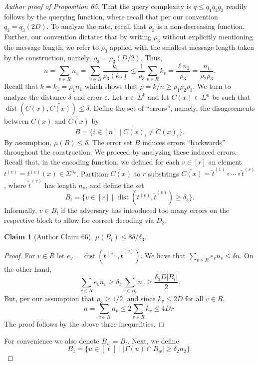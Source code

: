\documentclass[10pt,a4paper]{article}
\newtheorem{ntclaim}[nttheorem]{Claim}
\begin{document}
\begin{proof}[Author proof of Proposition 65]
That the query complexity is $q\leq q_1q_2q_3$ readily follows by the querying function, where recall that per our convention $q_3=q_3(2D)$. To analyze the rate, recall that $\rho_3$ is a non-decreasing function. Further, our convention dictates that by writing $\rho_3$ without explicitly mentioning the message length, we refer to $\rho_3$ applied with the smallest message length taken by the construction, namely, $\rho_3=\rho_3(D/2)$. Thus,
\[n=\sum_{v\in R}n_v=\sum_{v\in R}\frac{k_v}{\rho_3(k_v)}\leq\frac1{\rho_3}\sum_{v\in R}k_v=\frac{\ell n_2}{\rho_3}=\frac{n_1}{\rho_2\rho_3}.\]
Recall that $k=k_1=\rho_1n_1$ which shows that $\rho=k/n\geq\rho_1\rho_2\rho_3$.
We turn to analyze the distance $\delta$ and error $\varepsilon$. Let $x\in\Sigma^k$ and let $\widetilde{C(x)}\in\Sigma^n$ be such that $\operatorname{dist}(C(x),\widetilde{C(x)})\leq\delta$. Define the set of ``errors'', namely, the disagreements between $C(x)$ and $\widetilde{C(x)}$ by
\[B=\{i\in[n]\mid\widetilde{C(x)}_i\ne C(x)_i\}.\]
By assumption, $\mu(B)\leq\delta$. The error set $B$ induces errors ``backwards'' throughout the construction. We proceed by analyzing these induced errors. Recall that, in the encoding function, we defined for each $v\in[r]$ an element $t^{(v)}=t^{(v)}(x)\in\Sigma^{n_v}$. Partition $\widetilde{C(x)}$ to $r$ substrings $\widetilde{C(x)}=\widetilde t^{(1)}\circ\cdots\circ\widetilde t^{(r)}$, where $\widetilde t^{(v)}$ has length $n_v$, and define the set
\[B_t=\{v\in[r]\mid\operatorname{dist}(t^{(v)},\widetilde t^{(v)})\geq\delta_3\}.\]
Informally, $v\in B_t$ if the adversary has introduced too many errors on the respective block to allow for correct decoding via $D_3$.
\begin{ntclaim}[Author Claim 66] $\mu(B_t)\leq8\delta/\delta_3$.\end{ntclaim}
\begin{proof}
For $v\in R$ let $e_v=\operatorname{dist}(t^{(v)},\widetilde t^{(v)})$. We have that $\sum_{v\in R}e_vn_v\leq\delta n$. On the other hand,
\[\sum_{v\in R}e_vn_v\geq\delta_3\sum_{v\in B_t}n_v\geq\frac{\delta_3D|B_t|}{2}.\]
But, per our assumption that $\rho_3\geq1/2$, and since $k_v\leq2D$ for all $v\in R$,
\[n=\sum_{v\in R}n_v\leq2\sum_{v\in R}k_v\leq4Dr.\]
The proof follows by the above three inequalities.
\end{proof}
For convenience we also denote $B_w=B_t$. Next, we define
\begin{equation}B_z=\{u\in[\ell]\mid|\Gamma(u)\cap B_w|\geq\delta_2n_2\}.\tag{6.1}\end{equation}

\end{proof}
\end{document}
